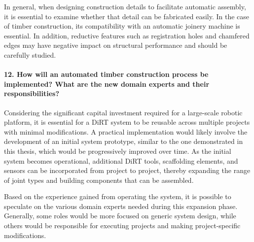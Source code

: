 In general, when designing construction details to facilitate automatic assembly, it is essential to examine whether that detail can be fabricated easily. In the case of timber construction, its compatibility with an automatic joinery machine is essential. In addition, reductive features such as registration holes and chamfered edges may have negative impact on structural performance and should be carefully studied.

\paragraph{12. How will an automated timber construction process be implemented? What are the new domain experts and their responsibilities?}


Considering the significant capital investment required for a large-scale robotic platform, it is essential for a DiRT system to be reusable across multiple projects with minimal modifications. A practical implementation would likely involve the development of an initial system prototype, similar to the one demonstrated in this thesis, which would be progressively improved over time. As the initial system becomes operational, additional DiRT tools, scaffolding elements, and sensors can be incorporated from project to project, thereby expanding the range of joint types and building components that can be assembled.

Based on the experience gained from operating the system, it is possible to speculate on the various domain experts needed during this expansion phase. Generally, some roles would be more focused on generic system design, while others would be responsible for executing projects and making project-specific modifications.

